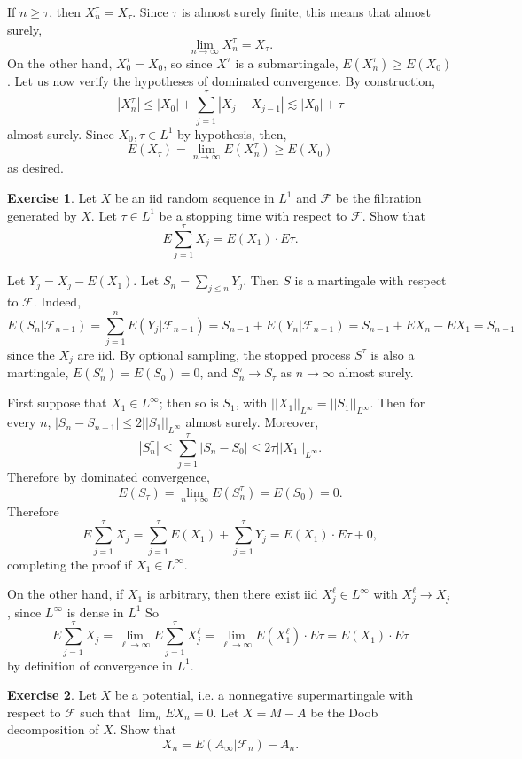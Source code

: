 \documentclass[10pt]{article}
\theoremstyle{definition}
\newtheorem{exer}{Exercise}
\begin{document}
If $n \geq \tau$, then $X^\tau_n = X_\tau$.
Since $\tau$ is almost surely finite, this means that almost surely,
$$\lim_{n \to \infty} X^\tau_n = X_\tau.$$
On the other hand, $X^\tau_0 = X_0$, so since $X^\tau$ is a submartingale, $E(X^\tau_n) \geq E(X_0)$.
Let us now verify the hypotheses of dominated convergence. By construction,
$$|X^\tau_n| \leq |X_0| + \sum_{j=1}^\tau |X_j - X_{j-1}| \lesssim |X_0| + \tau$$
almost surely. Since $X_0, \tau \in L^1$ by hypothesis, then,
$$E(X_\tau) = \lim_{n \to \infty} E(X^\tau_n) \geq E(X_0)$$
as desired.

\begin{exer}
Let $X$ be an iid random sequence in $L^1$ and $\mathcal F$ be the filtration generated by $X$.
Let $\tau \in L^1$ be a stopping time with respect to $\mathcal F$. Show that
$$E\sum_{j=1}^\tau X_j = E(X_1) \cdot E\tau.$$
\end{exer}

Let $Y_j = X_j - E(X_1)$.
Let $S_n = \sum_{j \leq n} Y_j$. Then $S$ is a martingale with respect to $\mathcal F$. Indeed,
$$E(S_n|\mathcal F_{n-1}) = \sum_{j=1}^n E(Y_j|\mathcal F_{n-1}) = S_{n-1} + E(Y_n|\mathcal F_{n-1}) = S_{n-1} + EX_n - EX_1 = S_{n-1}$$
since the $X_j$ are iid.
By optional sampling, the stopped process $S^\tau$ is also a martingale, $E(S^\tau_n) = E(S_0) = 0$, and $S^\tau_n \to S_\tau$ as $n \to \infty$ almost surely.

First suppose that $X_1 \in L^\infty$; then so is $S_1$, with $||X_1||_{L^\infty} = ||S_1||_{L^\infty}$.
Then for every $n$, $|S_n - S_{n-1}| \leq 2||S_1||_{L^\infty}$ almost surely.
Moreover,
$$|S_n^\tau| \leq \sum_{j=1}^\tau |S_n - S_0| \leq 2\tau||X_1||_{L^\infty}.$$
Therefore by dominated convergence,
$$E(S_\tau) = \lim_{n \to \infty} E(S^\tau_n) = E(S_0) = 0.$$
Therefore
$$E\sum_{j=1}^\tau X_j = \sum_{j=1}^\tau E(X_1) + \sum_{j=1}^\tau Y_j = E(X_1) \cdot E\tau + 0,$$
completing the proof if $X_1 \in L^\infty$.

On the other hand, if $X_1$ is arbitrary, then there exist iid $X_j^\ell \in L^\infty$ with $X_j^\ell \to X_j$, since $L^\infty$ is dense in $L^1$
So
$$E\sum_{j=1}^\tau X_j = \lim_{\ell \to \infty} E\sum_{j=1}^\tau X_j^\ell = \lim_{\ell \to \infty} E(X_1^\ell) \cdot E\tau = E(X_1) \cdot E\tau$$
by definition of convergence in $L^1$.

\begin{exer}
Let $X$ be a potential, i.e. a nonnegative supermartingale with respect to $\mathcal F$ such that $\lim_n EX_n = 0$. Let $X = M - A$ be the Doob decomposition of $X$.
Show that
$$X_n = E(A_\infty|\mathcal F_n) - A_n.$$
\end{exer}
\end{document}
